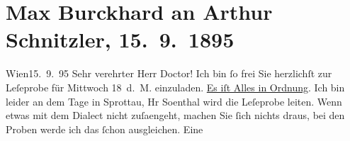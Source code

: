 

         
         \renewcommand{\erwaehntePersonen}{Personen: Anna Bauer, Giuseppe Giacosa, Adolf von Sonnenthal, Fanny Walbeck}
         \renewcommand{\erwaehnteInstitutionen}{Institutionen: Burgtheater}
         \renewcommand{\erwaehnteOrte}{Orte: Sprottau, Wien}
         \renewcommand{\erwaehnteWerke}{Werke: Liebelei. Schauspiel in drei Akten, Rechte der Seele. Schauspiel in einem Act}
               \section[Max Burckhard an Arthur Schnitzler, 15. 9. 1895]{ Max Burckhard an Arthur Schnitzler, 15. 9. 1895}\nopagebreak{}\rehead{ }\begin{ledgroupsized}[t]{13cm}\normalsize\beginnumbering \toendnotes[C]{\smallbreak\pagebreak[2]} 
\toendnotes[C]{\smallbreak}\pstart
           \noindent{}{\pb}\textcolor{gray}{\textbf{\label{T_L00484-1v}\label{T_L00484-1h}}}\hfill Wien15. 9. 95\pend
           \pstart{}Sehr verehrter Herr Doctor!\pend\pstart
           Ich bin ſo frei Sie herzlichſt zur Leſeprobe für Mittwoch 18 d. M. einzuladen. \uline{Es iſt Alles in Ordnung}. Ich bin leider an dem Tage in
                  Sprottau, Hr So{\geminationn}enthal wird die Leſeprobe
               leiten. Wenn etwas mit dem Dialect nicht zuſa{\geminationm}engeht,
               machen Sie ſich nichts draus, bei den Proben werde ich das ſchon ausgleichen. Eine

\end{ledgroupsized}
